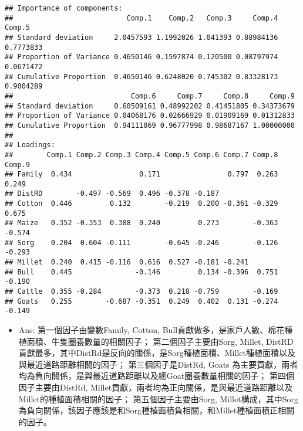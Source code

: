 \documentclass[]{article}
\newenvironment{Shaded}{\begin{snugshade}}{\end{snugshade}}
\newcommand{\DataTypeTok}[1]{\textcolor[rgb]{0.13,0.29,0.53}{#1}}
\newcommand{\KeywordTok}[1]{\textcolor[rgb]{0.13,0.29,0.53}{\textbf{#1}}}
\newcommand{\NormalTok}[1]{#1}
\newcommand{\OperatorTok}[1]{\textcolor[rgb]{0.81,0.36,0.00}{\textbf{#1}}}
\newcommand{\OtherTok}[1]{\textcolor[rgb]{0.56,0.35,0.01}{#1}}
\newcommand{\StringTok}[1]{\textcolor[rgb]{0.31,0.60,0.02}{#1}}
\providecommand{\tightlist}{%
  \setlength{\itemsep}{0pt}\setlength{\parskip}{0pt}}
\begin{document}
\begin{Shaded}
\end{Shaded}

\begin{verbatim}
## Importance of components:
##                           Comp.1    Comp.2   Comp.3     Comp.4    Comp.5
## Standard deviation     2.0457593 1.1992026 1.041393 0.88984136 0.7773833
## Proportion of Variance 0.4650146 0.1597874 0.120500 0.08797974 0.0671472
## Cumulative Proportion  0.4650146 0.6248020 0.745302 0.83328173 0.9004289
##                            Comp.6     Comp.7     Comp.8     Comp.9
## Standard deviation     0.60509161 0.48992202 0.41451805 0.34373679
## Proportion of Variance 0.04068176 0.02666929 0.01909169 0.01312833
## Cumulative Proportion  0.94111069 0.96777998 0.98687167 1.00000000
## 
## Loadings:
##        Comp.1 Comp.2 Comp.3 Comp.4 Comp.5 Comp.6 Comp.7 Comp.8 Comp.9
## Family  0.434                0.171                0.797  0.263  0.249
## DistRD        -0.497 -0.569  0.496 -0.378 -0.187                     
## Cotton  0.446         0.132        -0.219  0.200 -0.361 -0.329  0.675
## Maize   0.352 -0.353  0.388  0.240         0.273        -0.363 -0.574
## Sorg    0.204  0.604 -0.111        -0.645 -0.246        -0.126 -0.293
## Millet  0.240  0.415 -0.116  0.616  0.527 -0.181 -0.241              
## Bull    0.445               -0.146         0.134 -0.396  0.751 -0.190
## Cattle  0.355 -0.284        -0.373  0.218 -0.759        -0.169       
## Goats   0.255        -0.687 -0.351  0.249  0.402  0.131 -0.274 -0.149
\end{verbatim}

\begin{itemize}
\tightlist
\item
  Ans: 第一個因子由變數Family, Cotton,
  Bull貢獻做多，是家戶人數、棉花種植面積、牛隻圈養數量的相關因子；
  第二個因子主要由Sorg, Millet,
  DistRD貢獻最多，其中DistRd是反向的關係，是Sorg種植面積、Millet種植面積以及與最近道路距離相關的因子；
  第三個因子是DistRd, Goats
  為主要貢獻，兩者均為負向關係，是與最近道路距離以及總Goat圈養數量相關的因子；
  第四個因子主要由DistRd,
  Millet貢獻，兩者均為正向關係，是與最近道路距離以及Millet的種植面積相關的因子；
  第五個因子主要由Sorg,
  Millet構成，其中Sorg為負向關係，該因子應該是和Sorg種植面積負相關，和Millet種植面積正相關的因子。
\end{itemize}
\end{document}
